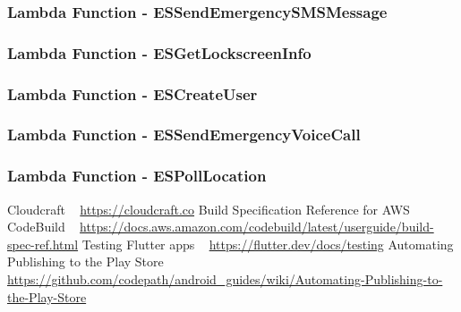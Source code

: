 \documentclass[10pt, a4paper]{article}
\begin{document}
\subsubsection{Lambda Function - ESSendEmergencySMSMessage }
\subsubsection{Lambda Function - ESGetLockscreenInfo }
\subsubsection{Lambda Function - ESCreateUser }
\subsubsection{Lambda Function - ESSendEmergencyVoiceCall }
\subsubsection{Lambda Function - ESPollLocation }


	
\begin{thebibliography}{9}
Cloudcraft ~ \url{https://cloudcraft.co}
Build Specification Reference for AWS CodeBuild ~ \url{https://docs.aws.amazon.com/codebuild/latest/userguide/build-spec-ref.html}
Testing Flutter apps ~ \url{https://flutter.dev/docs/testing}
Automating Publishing to the Play Store ~ \url{https://github.com/codepath/android_guides/wiki/Automating-Publishing-to-the-Play-Store}
\end{thebibliography}
\end{document}
